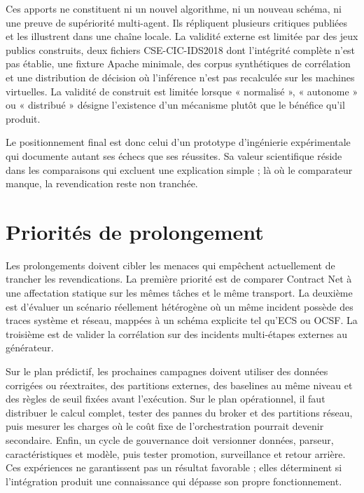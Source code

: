Ces apports ne constituent ni un nouvel algorithme, ni un nouveau schéma, ni une preuve de
supériorité multi-agent. Ils répliquent plusieurs critiques publiées et les illustrent
dans une chaîne locale. La validité externe est limitée par des jeux publics construits,
deux fichiers CSE-CIC-IDS2018 dont l'intégrité complète n'est pas établie, une fixture
Apache minimale, des corpus synthétiques de corrélation et une distribution de décision
où l'inférence n'est pas recalculée sur les machines virtuelles. La validité de construit
est limitée lorsque « normalisé », « autonome » ou « distribué » désigne l'existence d'un
mécanisme plutôt que le bénéfice qu'il produit.

Le positionnement final est donc celui d'un prototype d'ingénierie expérimentale qui
documente autant ses échecs que ses réussites. Sa valeur scientifique réside dans les
comparaisons qui excluent une explication simple ; là où le comparateur manque, la
revendication reste non tranchée.

\section{Priorités de prolongement}

Les prolongements doivent cibler les menaces qui empêchent actuellement de trancher les
revendications. La première priorité est de comparer Contract Net à une affectation
statique sur les mêmes tâches et le même transport. La deuxième est d'évaluer un scénario
réellement hétérogène où un même incident possède des traces système et réseau, mappées à
un schéma explicite tel qu'ECS ou OCSF. La troisième est de valider la corrélation sur des
incidents multi-étapes externes au générateur.

Sur le plan prédictif, les prochaines campagnes doivent utiliser des données corrigées ou
réextraites, des partitions externes, des baselines au même niveau et des règles de seuil
fixées avant l'exécution. Sur le plan opérationnel, il faut distribuer le calcul complet,
tester des pannes du broker et des partitions réseau, puis mesurer les charges où le coût
fixe de l'orchestration pourrait devenir secondaire. Enfin, un cycle de gouvernance doit
versionner données, parseur, caractéristiques et modèle, puis tester promotion,
surveillance et retour arrière. Ces expériences ne garantissent pas un résultat favorable ;
elles déterminent si l'intégration produit une connaissance qui dépasse son propre
fonctionnement.
